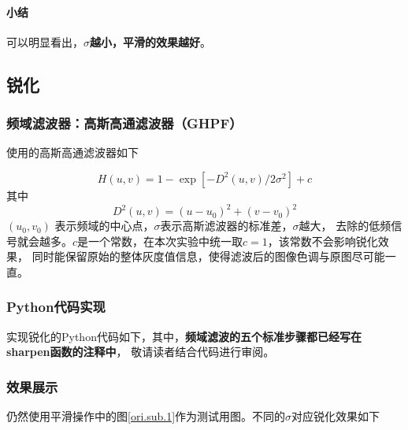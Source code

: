 \documentclass{article}
\begin{document}
\paragraph{小结}
可以明显看出，\textbf{$\sigma$越小，平滑的效果越好}。

\subsection{锐化}

\subsubsection{频域滤波器：高斯高通滤波器（GHPF）}
使用的高斯高通滤波器如下

\[
H(u,v) = 1 - \exp[-D^2(u,v)/2\sigma^2]	+ c
\]
其中
\[
D^2(u,v) = (u-u_0)^2 + (v-v_0)^2	
\]
$(u_0,v_0)$ 表示频域的中心点，$\sigma$表示高斯滤波器的标准差，$\sigma$越大，
去除的低频信号就会越多。$c$是一个常数，在本次实验中统一取$c=1$，该常数不会影响锐化效果，
同时能保留原始的整体灰度值信息，使得滤波后的图像色调与原图尽可能一直。

\subsubsection{Python代码实现}

实现锐化的Python代码如下，其中，\textbf{频域滤波的五个标准步骤都已经写在sharpen函数的注释中}，
敬请读者结合代码进行审阅。




\subsubsection{效果展示}
仍然使用平滑操作中的图\ref{ori.sub.1}作为测试用图。不同的$\sigma$对应锐化效果如下
\end{document}
